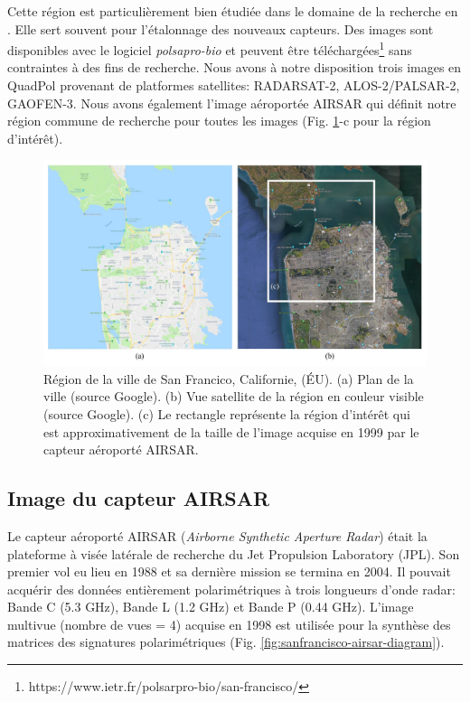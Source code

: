 Cette région est particulièrement bien étudiée dans le domaine de la recherche en \acrpolsarns.  Elle sert souvent pour l'étalonnage des nouveaux capteurs. Des images sont disponibles avec le logiciel \textit{polsapro-bio} et peuvent être téléchargées\footnote{https://www.ietr.fr/polsarpro-bio/san-francisco/} sans contraintes à des fins de recherche. Nous avons à notre disposition trois images en QuadPol  provenant de platformes satellites: RADARSAT-2, ALOS-2/PALSAR-2, GAOFEN-3. Nous avons également  l'image aéroportée AIRSAR qui définit notre région commune de recherche pour toutes les images (Fig. \ref{fig:sanfrancisco-roi-diagram}-c pour la région d'intérêt). 

\begin{figure}
  \includegraphics[width=1.0\linewidth]{figures/Chap3/sanfrancisco-roi.jpg}
  \centering
  \caption{
  \small{Région de la ville de San Francico, Californie, (ÉU). (a) Plan de la ville (source Google).  (b) Vue satellite de la région en couleur visible (source Google). (c) Le rectangle représente la région d'intérêt qui est approximativement de la taille de l'image acquise en 1999 par le capteur aéroporté AIRSAR. }
  }
  \label{fig:sanfrancisco-roi-diagram}
\end{figure}

\subsection{Image du capteur AIRSAR}

Le capteur aéroporté AIRSAR (\textit{Airborne Synthetic Aperture Radar}) était la plateforme à visée latérale \acrpolsar de recherche du Jet Propulsion Laboratory (JPL).  Son premier vol eu lieu en 1988 et sa dernière mission se termina en 2004. Il pouvait acquérir des données entièrement polarimétriques à trois longueurs d'onde radar: Bande C (5.3 GHz), Bande L (1.2 GHz) et Bande P (0.44 GHz). L'image multivue (nombre de vues = 4) acquise en 1998 est utilisée pour la synthèse des matrices \matcoh des signatures polarimétriques (Fig. \ref{fig:sanfrancisco-airsar-diagram}). 

